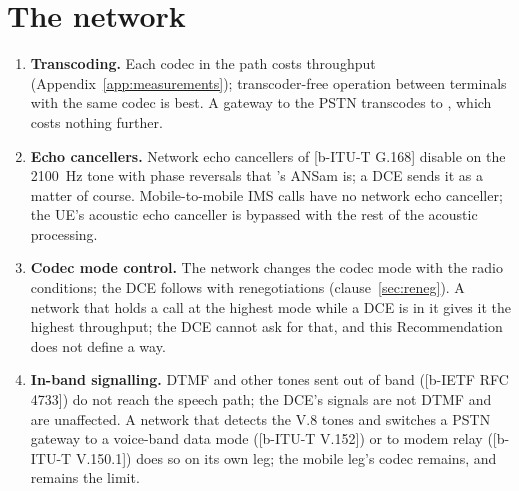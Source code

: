 \section{The network}
\begin{enumerate}[label=\alph*)]
\item \textbf{Transcoding.}  Each codec in the path costs throughput
  (Appendix~\ref{app:measurements}); transcoder-free operation between
  terminals with the same codec is best.  A gateway to the PSTN
  transcodes to , which costs nothing further.
\item \textbf{Echo cancellers.}  Network echo cancellers of [b-ITU-T
  G.168] disable on the 2100~Hz tone with phase reversals that 's
  ANSam is; a DCE sends it as a matter of course.  Mobile-to-mobile IMS
  calls have no network echo canceller; the UE's acoustic echo canceller
  is bypassed with the rest of the acoustic processing.
\item \textbf{Codec mode control.}  The network changes the codec mode
  with the radio conditions; the DCE follows with renegotiations
  (clause~\ref{sec:reneg}).  A network that holds a call at the highest
  mode while a DCE is in it gives it the highest throughput; the DCE
  cannot ask for that, and this Recommendation does not define a way.
\item \textbf{In-band signalling.}  DTMF and other tones sent out of band
  ([b-IETF RFC 4733]) do not reach the speech path; the DCE's signals are
  not DTMF and are unaffected.  A network that detects the V.8 tones and
  switches a PSTN gateway to a voice-band data mode ([b-ITU-T V.152]) or
  to modem relay ([b-ITU-T V.150.1]) does so on its own leg; the mobile
  leg's codec remains, and remains the limit.
\end{enumerate}

